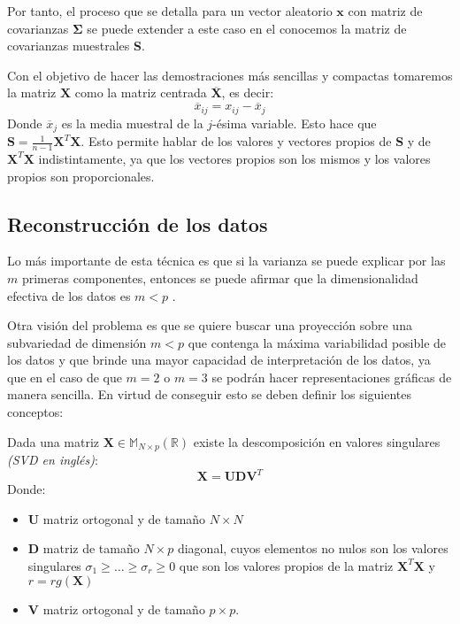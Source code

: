 \noindent Por tanto, el proceso que se detalla para un vector aleatorio $\mathbf{x}$ con matriz de covarianzas $\mathbf{\Sigma}$ se puede extender a este caso en el conocemos la matriz de covarianzas muestrales \textbf{S}.

\noindent Con el objetivo de hacer las demostraciones más sencillas y compactas tomaremos la matriz $\textbf{X}$ como la matriz centrada $\overline{\textbf{X}}$, es decir: 
\begin{equation}
\overline{x}_{ij}=x_{ij}-\overline{x}_j
\end{equation}
Donde $\overline{x}_j$ es la media muestral de la $j$-ésima variable. Esto hace que $\textbf{S}=\frac{1}{n-1}\textbf{X}^T\textbf{X}$. Esto permite hablar de los valores y vectores propios de \textbf{S} y de $\textbf{X}^T \textbf{X}$ indistintamente, ya que los vectores propios son los mismos y los valores propios son proporcionales. 


\subsection{Reconstrucción de los datos}

\noindent Lo más importante de esta técnica es que si la varianza se puede explicar por las $m$ primeras componentes, entonces se puede afirmar que la dimensionalidad efectiva de los datos es $m<p$ \cite{Chatfield 1989}. 

\noindent Otra visión del problema es que se quiere buscar una proyección sobre una subvariedad de dimensión $m<p$ que contenga la máxima variabilidad posible de los datos y que brinde una mayor capacidad de interpretación de los datos, ya que en el caso de que $m=2$ o $m=3$ se podrán hacer representaciones gráficas de manera sencilla. En virtud de conseguir esto se deben definir los siguientes conceptos:

\begin{defi}
Dada una matriz $\textbf{X}\in  \mathbb{M}_{N\times p}(\mathbb{R})$ existe la descomposición en valores singulares \textit{(SVD en inglés)}\cite{Abdi 2010}:
\begin{equation}
\textbf{X}=\textbf{U}\mathbf{D}\textbf{V}^T
\end{equation}
Donde:
\begin{itemize}
\item \textbf{U} matriz ortogonal y de tamaño $N \times N$
\item $\mathbf{D}$ matriz de tamaño $N \times p $ diagonal, cuyos elementos no nulos son los valores singulares $\sigma_1\geq\ldots\geq \sigma_r\geq 0$ que son los valores propios de la matriz $\textbf{X}^T\textbf{X}$ y $r=rg(\textbf{X})$
\item \textbf{V} matriz ortogonal y de tamaño $p \times p$. 
\end{itemize}
\end{defi}

